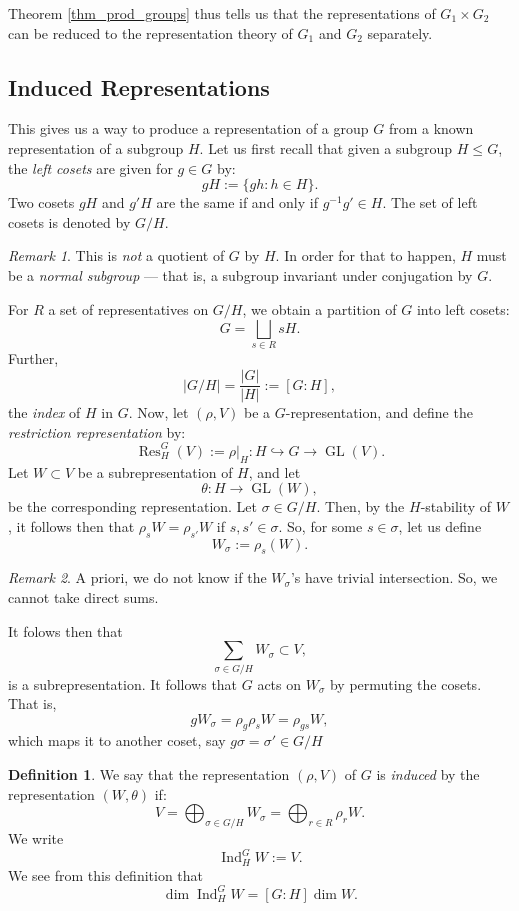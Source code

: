 \documentclass[a4paper]{report}
\theoremstyle{definition}
\newtheorem{definition}{Definition}
\theoremstyle{remark}
\newtheorem{remark}{Remark}
\theoremstyle{proposition}
\theoremstyle{conjecture}
\theoremstyle{lemma}
\theoremstyle{corollary}
\theoremstyle{exercise}
\theoremstyle{example}
\newcommand{\on}{\operatorname}
\begin{document}
Theorem \ref{thm_prod_groups} thus tells us that the representations of 
$G_1\times G_2$ can be reduced to the representation theory of 
$G_1$ and $G_2$ separately. 

\subsection{Induced Representations}

This gives us a way to produce a representation of a group $G$ from a 
known representation of a subgroup $H$.
Let us first recall that given a subgroup $H\leq G$, the \emph{left cosets}
are given for $g\in G$ by:
$$gH := \lbrace gh : h\in H\rbrace.$$
Two cosets $gH$ and $g'H$ are the same if and only if 
$g^{-1}g'\in H$. The set of left cosets is denoted by $G/H$.
\begin{remark}
    This is \emph{not} a quotient of $G$ by $H$. In order for that to happen,
    $H$ must be a \emph{normal subgroup} --- that is, a subgroup invariant
    under conjugation by $G$.
\end{remark}
For $R$ a set of representatives on $G/H$, we obtain a partition of $G$ 
into left cosets:
$$G = \bigsqcup_{s \in R} sH.$$
Further, $$\vert G/H\vert = \frac{\vert G\vert}{\vert H\vert} := [G:H],$$
the \emph{index} of $H$ in $G$. Now, let $(\rho,V)$ be a $G$-representation,
and define the \emph{restriction representation} by:
$$\on{Res}_H^G(V) := \rho\vert_H : H\hookrightarrow G \longrightarrow \on{GL}(V).$$
Let $W\subset V$ be a subrepresentation of $H$, and let 
$$\theta : H \longrightarrow \on{GL}(W),$$
be the corresponding representation.
Let $\sigma \in G/H$. Then, by the $H$-stability of $W$, it follows then 
that $\rho_sW = \rho_{s'}W$ if $s,s'\in\sigma$. So, for some $s\in\sigma$,
let us define $$W_\sigma:= \rho_s(W).$$
\begin{remark}
    A priori, we do not know if the $W_\sigma$'s have trivial intersection.
    So, we cannot take direct sums.
\end{remark}
It folows then that $$\sum_{\sigma \in G/H} W_\sigma \subset V,$$
is a subrepresentation. 
It follows that $G$ acts on $W_\sigma$ by permuting the cosets. That is,
$$gW_\sigma = \rho_g \rho_sW = \rho_{gs}W,$$
which maps it to another coset, say $g\sigma = \sigma' \in G/H$

\begin{definition}
    We say that the representation $(\rho,V)$ of $G$ is 
    \emph{induced} by the representation $(W,\theta)$ if:
    $$V = \bigoplus_{\sigma \in G/H}W_\sigma = \bigoplus_{r \in R} \rho_rW.$$
    We write $$\on{Ind}_H^G W := V.$$
    We see from this definition that $$\dim \on{Ind}_H^GW = [G:H]\dim W.$$
\end{definition}
\end{document}
